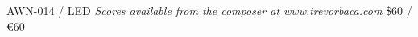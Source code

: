 \documentclass{article}
\begin{document}
\null \vfill

AWN-014 / LED \hfill
\textit{Scores available from the composer at www.trevorbaca.com}
\hfill \$60 / \euro 60
\end{document}
